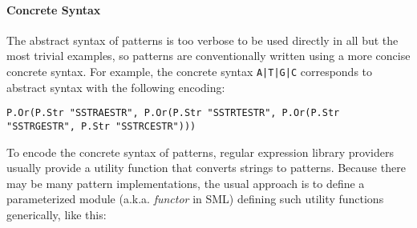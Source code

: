 \paragraph{Concrete Syntax} The abstract syntax of patterns is too verbose to be used directly in all but the most trivial examples, so patterns are conventionally written using a more concise concrete syntax. For example, the concrete syntax \lstinline{A|T|G|C} corresponds to abstract syntax with the following encoding:
\begin{lstlisting}[numbers=none,mathescape=|]
P.Or(P.Str "SSTRAESTR", P.Or(P.Str "SSTRTESTR", P.Or(P.Str "SSTRGESTR", P.Str "SSTRCESTR")))
\end{lstlisting} 





To encode the concrete syntax of patterns, regular expression library providers usually provide a utility function that converts strings to patterns. Because there may be many pattern implementations, the usual approach is to define a parameterized module (a.k.a. \emph{functor} in SML) defining such utility functions generically, like this:

